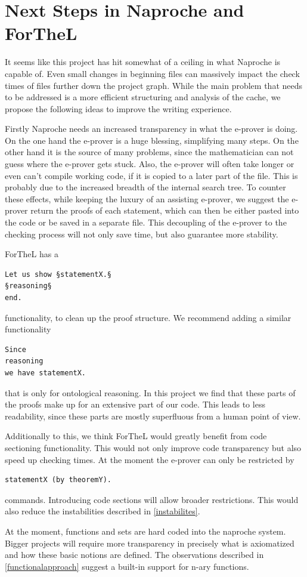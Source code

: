 \documentclass[11pt]{article}
\begin{document}
\newpage 
\section{Next Steps in Naproche and ForTheL}

It seems like this project has hit somewhat of a ceiling in what Naproche is capable of. 
Even small changes in beginning files can massively impact the check times of files further down the project graph.
While the main problem that needs to be addressed is a more efficient structuring and analysis of the cache, we propose the following ideas to improve the writing experience.

Firstly Naproche needs an increased transparency in what the e-prover is doing. On the one hand the e-prover is a huge blessing, simplifying many steps. On the other hand it is the source of many problems, since the mathematician can not guess where the e-prover gets stuck. Also, the e-prover will often take longer or even can't compile working code, if it is copied to a later part of the file. This is probably due to the increased breadth of the internal search tree. To counter these effects, while keeping the luxury of an assisting e-prover, we suggest the e-prover return the proofs of each statement, which can then be either pasted into the code or be saved in a separate file. This decoupling of the e-prover to the checking process will not only save time, but also guarantee more stability.

ForTheL has a 
\begin{lstlisting}
Let us show §statementX.§
§reasoning§
end.
\end{lstlisting} 
functionality, to clean up the proof structure. We recommend adding a similar functionality
\begin{lstlisting}
Since 
reasoning
we have statementX.
\end{lstlisting} 
that is only for ontological reasoning. In this project we find that these parts of the proofs make up for an extensive part of our code. This leads to less readability, since these parts are mostly superfluous from a human point of view.

Additionally to this, we think ForTheL would greatly benefit from code sectioning functionality. This would not only improve code transparency but also speed up checking times. At the moment the e-prover can only be restricted by 
\begin{lstlisting}
statementX (by theoremY).
\end{lstlisting}  commands. Introducing code sections will allow broader restrictions. This would also reduce the instabilities described in \ref{instabilites}.

At the moment, functions and sets are hard coded into the naproche system. Bigger projects will require more transparency in precisely what is axiomatized and how these basic notions are defined. The observations described in \ref{functionalapproach} suggest a built-in support for n-ary functions.
\end{document}
